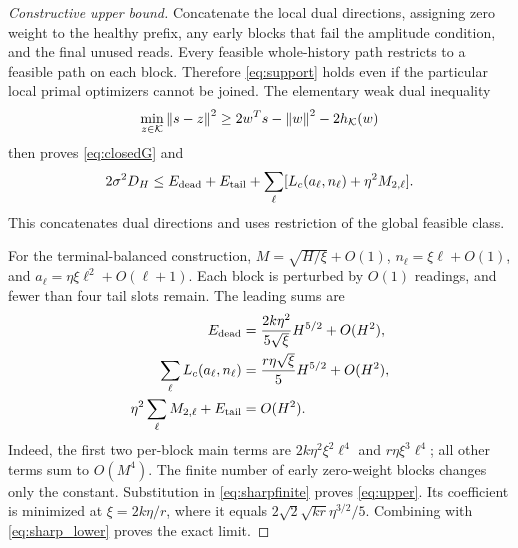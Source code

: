 \begin{proof}[Constructive upper bound]
Concatenate the local dual directions, assigning zero weight to the healthy prefix, any early blocks that fail the amplitude condition, and the final unused reads. Every feasible whole-history path restricts to a feasible path on each block. Therefore \eqref{eq:support} holds even if the particular local primal optimizers cannot be joined. The elementary weak dual inequality
\begin{equation}
 \min_{z\in\mathcal K}\left\lVert s-z\right\rVert^2
 \ge2w^Ts-\left\lVert w\right\rVert^2-2h_\mathcal K(w)
\end{equation}
then proves \eqref{eq:closedG} and
\begin{equation}
2\sigma^2D_H\le E_{\rm dead}+E_{\rm tail}
+\sum_\ell[L_c(a_\ell,n_\ell)+\eta^2M_{2,\ell}].\label{eq:sharpfinite}
\end{equation}
This concatenates dual directions and uses restriction of the global feasible class.

For the terminal-balanced construction, $M=\sqrt{H/\xi}+O(1)$, $n_\ell=\xi\ell+O(1)$, and $a_\ell=\eta\xi\ell^2+O(\ell+1)$. Each block is perturbed by $O(1)$ readings, and fewer than four tail slots remain. The leading sums are
\begin{align}
 E_{\rm dead}&=\frac{2k\eta^2}{5\sqrt\xi}H^{5/2}+O(H^2),\nonumber\\
 \sum_\ell L_c(a_\ell,n_\ell)&=\frac{r\eta\sqrt\xi}{5}H^{5/2}+O(H^2),\nonumber\\
 \eta^2\sum_\ell M_{2,\ell}+E_{\rm tail}&=O(H^2).
\end{align}
Indeed, the first two per-block main terms are $2k\eta^2\xi^2\ell^4$ and $r\eta\xi^3\ell^4$; all other terms sum to $O(M^4)$. The finite number of early zero-weight blocks changes only the constant. Substitution in \eqref{eq:sharpfinite} proves \eqref{eq:upper}. Its coefficient is minimized at $\xi=2k\eta/r$, where it equals $2\sqrt2\sqrt{kr}\eta^{3/2}/5$. Combining with \eqref{eq:sharp_lower} proves the exact limit.
\end{proof}

